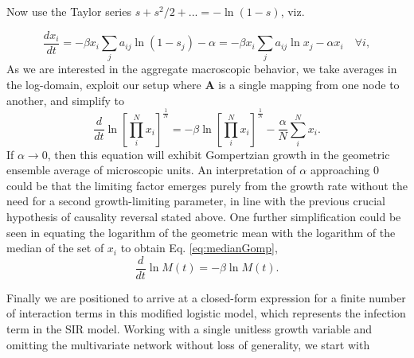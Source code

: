 \documentclass[sn-mathphys]{sn-jnl}%
\theoremstyle{thmstyleone}%
\theoremstyle{thmstyletwo}%
\theoremstyle{thmstylethree}%
\begin{document}
Now use the Taylor series $s+s^2/2+... = -\ln(1-s)$, viz.

\begin{equation}
\frac{d x_i}{dt} = -\beta x_i\sum_j{a_{ij}}\ln{(1 - s_j)} - \alpha = -\beta x_i\sum_j{a_{ij}}\ln{x_j} - \alpha x_i \quad \forall i,
\end{equation}
As we are interested in the aggregate macroscopic behavior, we take averages in the log-domain, exploit our setup where $\mathbf{A}$ is a single mapping from one node to another, and simplify to
\begin{equation}
\frac{d}{{dt}} \ln\left[\prod_i^N{x_i}\right]^{\frac{1}{N}} = -\beta\ln\left[\prod_i^N{x_i}\right]^{\frac{1}{N}} - \frac{\alpha}{N}\sum_i^N x_i.
\end{equation}
If $\alpha\rightarrow 0$, then this equation will exhibit Gompertzian growth in the geometric ensemble average of microscopic units. 
An interpretation of $\alpha$ approaching $0$ could be that the limiting factor emerges purely from the growth rate without the need for a second growth-limiting parameter, in line with the previous crucial hypothesis of causality reversal stated above. One further simplification could be seen in equating the logarithm of the geometric mean with the logarithm of the median of the set of $x_i$ to obtain Eq. \ref{eq:medianGomp},
\begin{equation}
\frac{d}{dt}\ln{M(t)} = -\beta \ln{M(t)}.
\end{equation}

Finally we are positioned to arrive at a closed-form expression for a finite number of interaction terms in this modified logistic model, which represents the infection term in the SIR model. Working with a single unitless growth variable and omitting the multivariate network without loss of generality, we start with
\end{document}

